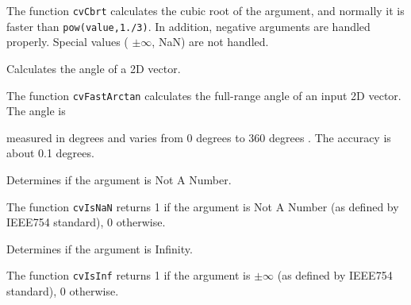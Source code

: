 The function \texttt{cvCbrt} calculates the cubic root of the argument, and normally it is faster than \texttt{pow(value,1./3)}. In addition, negative arguments are handled properly. Special values ( $ \pm \infty $, NaN) are not handled.

\label{FastArctan}

Calculates the angle of a 2D vector.


\begin{description}
\end{description}


The function \texttt{cvFastArctan} calculates the full-range angle of an input 2D vector. The angle is 

measured in degrees and varies from 0 degrees to 360 degrees . The accuracy is about 0.1 degrees.

\label{IsNaN}

Determines if the argument is Not A Number.


\begin{description}
\end{description}


The function \texttt{cvIsNaN} returns 1 if the argument is Not A Number (as defined by IEEE754 standard), 0 otherwise.


\label{IsInf}

Determines if the argument is Infinity.


\begin{description}
\end{description}


The function \texttt{cvIsInf} returns 1 if the argument is $ \pm \infty $ (as defined by IEEE754 standard), 0 otherwise.


\label{CartToPolar}

